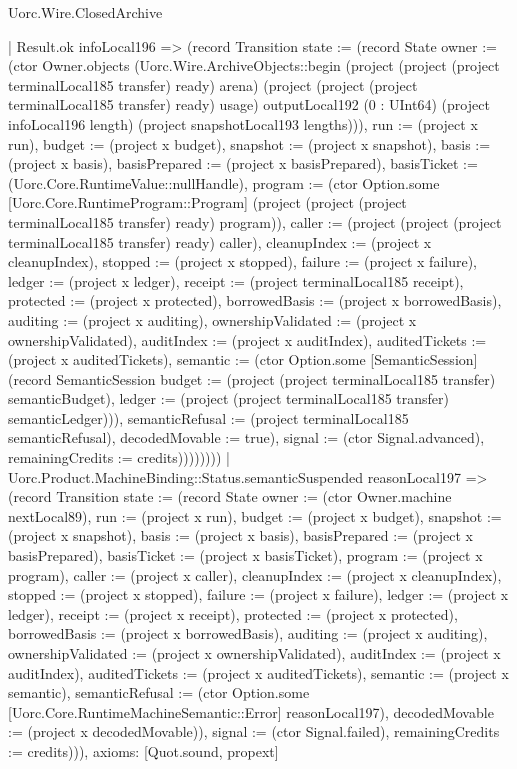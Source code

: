 \begin{lexlean}{Uorc.Wire.ClosedArchive}
\begin{semanticmodule}
{                | Result.ok infoLocal196 => (record Transition {state := (record State {owner := (ctor Owner.objects (Uorc.Wire.ArchiveObjects::begin (project (project (project terminalLocal185 transfer) ready) arena) (project (project (project terminalLocal185 transfer) ready) usage) outputLocal192 (0 : UInt64) (project infoLocal196 length) (project snapshotLocal193 lengths))), run := (project x run), budget := (project x budget), snapshot := (project x snapshot), basis := (project x basis), basisPrepared := (project x basisPrepared), basisTicket := (Uorc.Core.RuntimeValue::nullHandle), program := (ctor Option.some [Uorc.Core.RuntimeProgram::Program] (project (project (project terminalLocal185 transfer) ready) program)), caller := (project (project (project terminalLocal185 transfer) ready) caller), cleanupIndex := (project x cleanupIndex), stopped := (project x stopped), failure := (project x failure), ledger := (project x ledger), receipt := (project terminalLocal185 receipt), protected := (project x protected), borrowedBasis := (project x borrowedBasis), auditing := (project x auditing), ownershipValidated := (project x ownershipValidated), auditIndex := (project x auditIndex), auditedTickets := (project x auditedTickets), semantic := (ctor Option.some [SemanticSession] (record SemanticSession {budget := (project (project terminalLocal185 transfer) semanticBudget), ledger := (project (project terminalLocal185 transfer) semanticLedger)})), semanticRefusal := (project terminalLocal185 semanticRefusal), decodedMovable := true}), signal := (ctor Signal.advanced), remainingCredits := credits}))))))))
    | Uorc.Product.MachineBinding::Status.semanticSuspended reasonLocal197 => (record Transition {state := (record State {owner := (ctor Owner.machine nextLocal89), run := (project x run), budget := (project x budget), snapshot := (project x snapshot), basis := (project x basis), basisPrepared := (project x basisPrepared), basisTicket := (project x basisTicket), program := (project x program), caller := (project x caller), cleanupIndex := (project x cleanupIndex), stopped := (project x stopped), failure := (project x failure), ledger := (project x ledger), receipt := (project x receipt), protected := (project x protected), borrowedBasis := (project x borrowedBasis), auditing := (project x auditing), ownershipValidated := (project x ownershipValidated), auditIndex := (project x auditIndex), auditedTickets := (project x auditedTickets), semantic := (project x semantic), semanticRefusal := (ctor Option.some [Uorc.Core.RuntimeMachineSemantic::Error] reasonLocal197), decodedMovable := (project x decodedMovable)}), signal := (ctor Signal.failed), remainingCredits := credits}))),
  axioms: [Quot.sound, propext]
}


\end{semanticmodule}
\end{lexlean}
